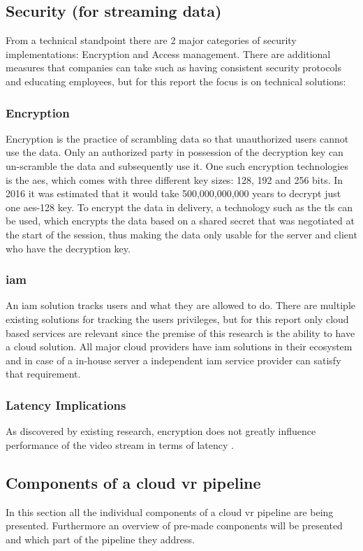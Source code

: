 \subsection{Security (for streaming data)}
From a technical standpoint there are 2 major categories of security implementations: Encryption and Access management. There are additional measures that companies can take such as having consistent security protocols and educating employees, but for this report the focus is on technical solutions:

\subsubsection{Encryption}
Encryption is the practice of scrambling data so that unauthorized users cannot use the data. Only an authorized party in possession of the decryption key can un-scramble the data and subsequently use it. 
One such encryption technologies is the \acrfull{aes}, which comes with three different key sizes: 128, 192 and 256 bits. In 2016 it was estimated that it would take 500,000,000,000 years to decrypt just one \acrshort{aes}-128 key.
To encrypt the data in delivery, a technology such as the \acrfull{tls} can be used, which encrypts the data based on a shared secret that was negotiated at the start of the session, thus making the data only usable for the server and client who have the decryption key.
\subsubsection{\acrfull{iam}}
An \acrshort{iam} solution tracks users and what they are allowed to do. There are multiple existing solutions for tracking the users privileges, but for this report only cloud based services are relevant since the premise of this research is the ability to have a cloud solution. All major cloud providers have \acrshort{iam} solutions in their ecosystem and in case of a in-house server a independent \acrshort{iam} service provider can satisfy that requirement.

\subsubsection{Latency Implications}
As discovered by existing research, encryption does not greatly influence performance of the video stream in terms of latency \parencite{Kaknjo_2019}.

\subsection{Components of a cloud \acrshort{vr} pipeline}
In this section all the individual components of a cloud \acrshort{vr} pipeline are being presented. Furthermore an overview of pre-made components will be presented and which part of the pipeline they address.

